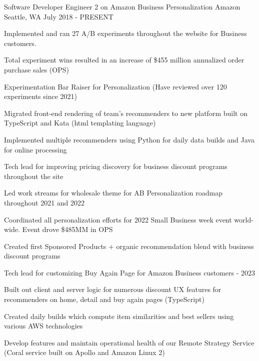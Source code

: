 

\begin{cventries}

  \cventry
    {Software Developer Engineer 2 on Amazon Business Personalization} %
    {Amazon} %
    {Seattle, WA} %
    {July 2018 - PRESENT} %
    {
      \begin{cvitems} %
        \item {Implemented and ran 27 A/B experiments throughout the website for Business customers.}
        \item {Total experiment wins resulted in an increase of \$455 million annualized order purchase sales (OPS)}
        \item {Experimentation Bar Raiser for Personalization (Have reviewed over 120 experiments since  2021)}
        \item {Migrated front-end rendering of team's recommenders to new platform built on TypeScript and Kata (html templating language)}
        \item {Implemented multiple recommenders using Python for daily data builds and Java for online processing}
        \item {Tech lead for improving pricing discovery for business discount programs throughout the site}
        \item {Led work streams for wholesale theme for AB Personalization roadmap throughout 2021 and 2022}
        \item {Coordinated all personalization efforts for 2022 Small Business week event world-wide. Event drove \$485MM in OPS }
        \item {Created first Sponsored Products + organic recommendation blend with business discount programs}
        \item {Tech lead for customizing Buy Again Page for Amazon Business customers - 2023}
        \item {Built out client and server logic for numerous discount UX features for recommenders on home, detail and buy again pages (TypeScript)}
        \item {Created daily builds which compute item similarities and best sellers using various AWS technologies}
        \item {Develop features and maintain operational health of our Remote Strategy Service (Coral service built on Apollo and Amazon Linux 2)}
      \end{cvitems}
    }
    

\end{cventries}
